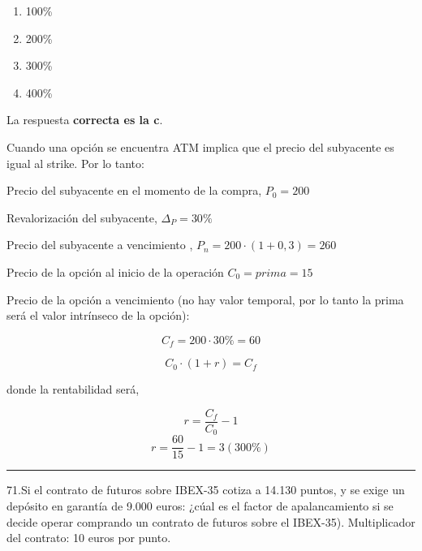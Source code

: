 \documentclass[
  letterpaper,
  DIV=11,
  numbers=noendperiod]{scrreprt}
\begin{document}
\begin{enumerate}
\def\labelenumi{\alph{enumi})}
\item
  100\%
\item
  200\%
\item
  300\%
\item
  400\%
\end{enumerate}

\begin{tcolorbox}[enhanced jigsaw, left=2mm, opacityback=0, colback=white, breakable, arc=.35mm, bottomrule=.15mm, rightrule=.15mm, toprule=.15mm, leftrule=.75mm, colframe=quarto-callout-tip-color-frame]
\begin{minipage}[t]{5.5mm}
\textcolor{quarto-callout-tip-color}{\faLightbulb}
\end{minipage}%
\begin{minipage}[t]{\textwidth - 5.5mm}

La respuesta \textbf{correcta es la c}.

Cuando una opción se encuentra ATM implica que el precio del subyacente
es igual al strike. Por lo tanto:

Precio del subyacente en el momento de la compra, \(P_0= 200\)

Revalorización del subyacente, \(\Delta_P = 30\%\)

Precio del subyacente a vencimiento , \(P_n= 200\cdot (1 + 0,3) = 260\)

Precio de la opción al inicio de la operación \(C_{0}=prima=15\)

Precio de la opción a vencimiento (no hay valor temporal, por lo tanto
la prima será el valor intrínseco de la opción):

\[C_f=200\cdot 30\%=60\]

\[C_0\cdot(1+r)=C_f\]

donde la rentabilidad será,

\[r=\frac{C_f}{C_0}-1\] \[r=\frac{60}{15}-1=3(300\%)\]

\end{minipage}%
\end{tcolorbox}

\begin{center}\rule{0.5\linewidth}{0.5pt}\end{center}

71.Si el contrato de futuros sobre IBEX-35 cotiza a 14.130 puntos, y se
exige un depósito en garantía de 9.000 euros: ¿cúal es el factor de
apalancamiento si se decide operar comprando un contrato de futuros
sobre el IBEX-35). Multiplicador del contrato: 10 euros por punto.
\end{document}
